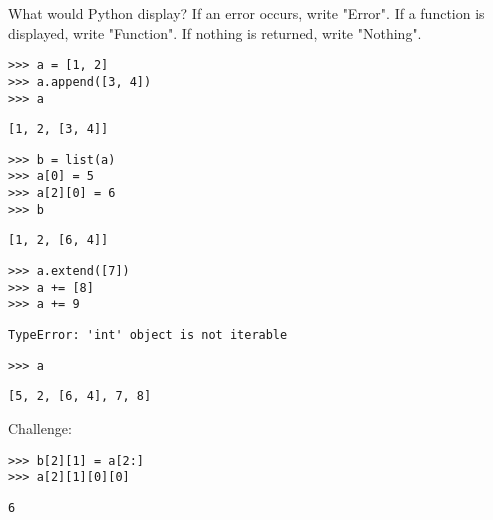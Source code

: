 \begin{blocksection}
\question What would Python display? If an error occurs, write "Error". If a function is displayed, write "Function". If nothing is returned, write "Nothing".

\begin{lstlisting}
>>> a = [1, 2]
>>> a.append([3, 4])
>>> a
\end{lstlisting}
\begin{solution}[0.25in]
\begin{lstlisting}
[1, 2, [3, 4]]
\end{lstlisting}
\end{solution}
\end{blocksection}

\begin{lstlisting}
>>> b = list(a)
>>> a[0] = 5
>>> a[2][0] = 6
>>> b
\end{lstlisting}
\begin{solution}[0.25in]
\begin{lstlisting}
[1, 2, [6, 4]]
\end{lstlisting}
\end{solution}

\begin{lstlisting}
>>> a.extend([7])
>>> a += [8]
>>> a += 9
\end{lstlisting}
\begin{solution}[0.25in]
\begin{lstlisting}
TypeError: 'int' object is not iterable
\end{lstlisting}
\end{solution}

\begin{lstlisting}
>>> a
\end{lstlisting}
\begin{solution}[0.25in]
\begin{lstlisting}
[5, 2, [6, 4], 7, 8]
\end{lstlisting}
\end{solution}

Challenge:
\begin{lstlisting}
>>> b[2][1] = a[2:]
>>> a[2][1][0][0]
\end{lstlisting}
\begin{solution}[0.25in]
\begin{lstlisting}
6
\end{lstlisting}
\end{solution}
